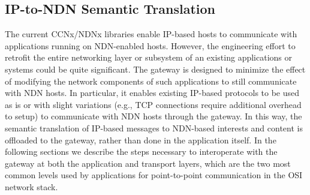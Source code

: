 \subsection{IP-to-NDN Semantic Translation}
The current CCNx/NDNx libraries enable IP-based hosts to communicate with applications running on NDN-enabled hosts. However, the engineering effort to retrofit the entire networking layer or subsystem of an existing applications or systems could be quite significant. The gateway is designed to minimize the effect of modifying the network components of such applications to still communicate with NDN hosts. In particular, it enables existing IP-based protocols to be used as is or with slight variations (e.g., TCP connections require additional overhead to setup) to communicate with NDN hosts through the gateway. In this way, the semantic translation of IP-based messages to NDN-based interests and content is offloaded to the gateway, rather than done in the application itself. In the following sections we describe the steps necessary to interoperate with the gateway at both the application and transport layers, which are the two most common levels used by applications for point-to-point communication in the OSI network stack.


